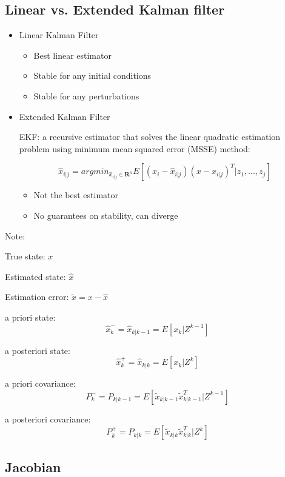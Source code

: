 \documentclass[11pt]{article}
\begin{document}
\subsection*{Linear vs. Extended Kalman filter}
\begin{itemize}
    \item Linear Kalman Filter
\begin{itemize}
    \item Best linear estimator 
    \item Stable for any initial conditions
    \item Stable for any perturbations 
\end{itemize}

\item Extended Kalman Filter

EKF: a recursive estimator that solves the linear quadratic estimation problem using minimum mean squared error (MSSE) method:

\[ \hat{x}_{i|j} = argmin_{\hat{x}_{i|j} \in \mathbf{R}^n}  E[(x_i - \hat{x}_{i|j}) (x - \hat{x}_{i|j} )^T | z_1, ..., z_j] \]

\begin{itemize}
    \item Not the best estimator
    \item No guarantees on stability, can diverge 
\end{itemize}

\end{itemize}

Note:

True state: $x$

Estimated state: $\hat{x}$

Estimation error: $\tilde{x} = x - \hat{x}$ 


a priori state: \[ \hat{x}^-_k  = \hat{x}_{k|k-1} = E[x_k | Z^{k-1}] \]

a posteriori state: \[ \hat{x}^+_k  = \hat{x}_{k|k} = E[x_k | Z^k]\]

a priori covariance: \[ P^-_{k} = P_{k|k-1} = E[\tilde{x}_{k|k-1} \tilde{x}^T_{k|k-1} | Z^{k-1}] \]

a posteriori covariance: \[ P^+_{k} = P_{k|k} = E[\tilde{x}_{k|k} \tilde{x}^T_{k|k} | Z^{k}] \]



\subsection*{Jacobian}
\end{document}
